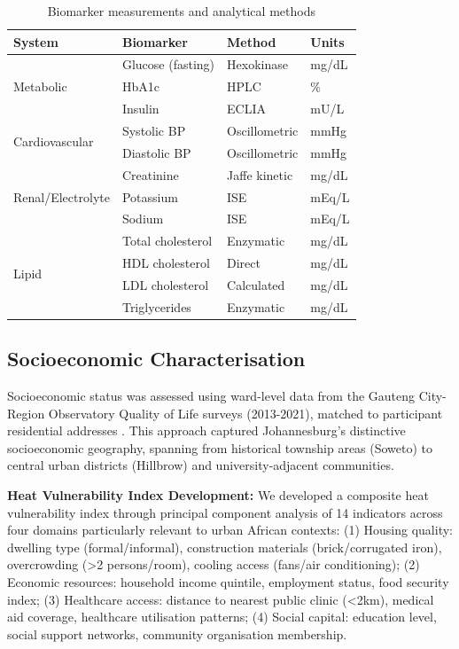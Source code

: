 \documentclass[11pt,a4paper]{article}
\begin{document}
\begin{table}[h!]
\centering
\caption{Biomarker measurements and analytical methods}
\begin{tabular}{llll}
\toprule
\textbf{System} & \textbf{Biomarker} & \textbf{Method} & \textbf{Units} \\
\midrule
\multirow{3}{*}{Metabolic} & Glucose (fasting) & Hexokinase & mg/dL \\
 & HbA1c & HPLC & \% \\
 & Insulin & ECLIA & mU/L \\
\midrule
\multirow{2}{*}{Cardiovascular} & Systolic BP & Oscillometric & mmHg \\
 & Diastolic BP & Oscillometric & mmHg \\
\midrule
\multirow{3}{*}{Renal/Electrolyte} & Creatinine & Jaffe kinetic & mg/dL \\
 & Potassium & ISE & mEq/L \\
 & Sodium & ISE & mEq/L \\
\midrule
\multirow{4}{*}{Lipid} & Total cholesterol & Enzymatic & mg/dL \\
 & HDL cholesterol & Direct & mg/dL \\
 & LDL cholesterol & Calculated & mg/dL \\
 & Triglycerides & Enzymatic & mg/dL \\
\bottomrule
\end{tabular}
\end{table}

\subsection{Socioeconomic Characterisation}

Socioeconomic status was assessed using ward-level data from the Gauteng City-Region Observatory Quality of Life surveys (2013-2021), matched to participant residential addresses \citep{DeKadt2021}. This approach captured Johannesburg's distinctive socioeconomic geography, spanning from historical township areas (Soweto) to central urban districts (Hillbrow) and university-adjacent communities.

\textbf{Heat Vulnerability Index Development:} We developed a composite heat vulnerability index through principal component analysis of 14 indicators across four domains particularly relevant to urban African contexts: (1) Housing quality: dwelling type (formal/informal), construction materials (brick/corrugated iron), overcrowding (>2 persons/room), cooling access (fans/air conditioning); (2) Economic resources: household income quintile, employment status, food security index; (3) Healthcare access: distance to nearest public clinic (<2km), medical aid coverage, healthcare utilisation patterns; (4) Social capital: education level, social support networks, community organisation membership.
\end{document}
